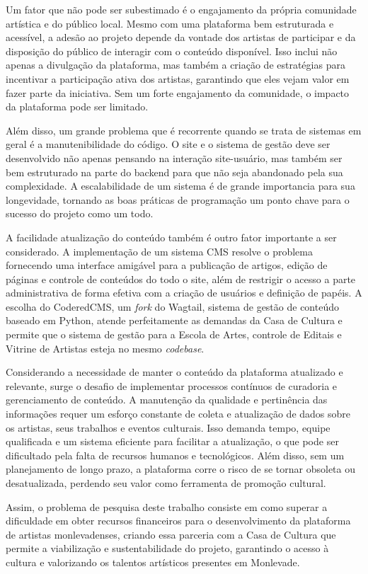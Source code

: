 Um fator que não pode ser subestimado é o engajamento da própria comunidade artística e do público local. Mesmo com uma plataforma bem estruturada e acessível, a adesão ao projeto depende da vontade dos artistas de participar e da disposição do público de interagir com o conteúdo disponível. Isso inclui não apenas a divulgação da plataforma, mas também a criação de estratégias para incentivar a participação ativa dos artistas, garantindo que eles vejam valor em fazer parte da iniciativa. Sem um forte engajamento da comunidade, o impacto da plataforma pode ser limitado.

Além disso, um grande problema que é recorrente quando se trata de sistemas em geral é a manutenibilidade do código. O site e o sistema de gestão deve ser desenvolvido não apenas pensando na interação site-usuário, mas também ser bem estruturado na parte do backend para que não seja abandonado pela sua complexidade. A escalabilidade de um sistema é de grande importancia para sua longevidade, tornando as boas práticas de programação um ponto chave para o sucesso do projeto como um todo.

A facilidade atualização do conteúdo também é outro fator importante a ser considerado. A implementação de um sistema CMS resolve o problema fornecendo uma interface amigável para a publicação de artigos, edição de páginas e controle de conteúdos do todo o site, além de restrigir o acesso a parte administrativa de forma efetiva com a criação de usuários e definição de papéis. A escolha do CoderedCMS, um \textit{fork} do Wagtail, sistema de gestão de conteúdo baseado em Python, atende perfeitamente as demandas da Casa de Cultura e permite que o sistema de gestão para a Escola de Artes, controle de Editais e Vitrine de Artistas esteja no mesmo \textit{codebase}.

Considerando a necessidade de manter o conteúdo da plataforma atualizado e relevante, surge o desafio de implementar processos contínuos de curadoria e gerenciamento de conteúdo. A manutenção da qualidade e pertinência das informações requer um esforço constante de coleta e atualização de dados sobre os artistas, seus trabalhos e eventos culturais. Isso demanda tempo, equipe qualificada e um sistema eficiente para facilitar a atualização, o que pode ser dificultado pela falta de recursos humanos e tecnológicos. Além disso, sem um planejamento de longo prazo, a plataforma corre o risco de se tornar obsoleta ou desatualizada, perdendo seu valor como ferramenta de promoção cultural.

Assim, o problema de pesquisa deste trabalho consiste em como superar a dificuldade em obter recursos financeiros para o desenvolvimento da plataforma de artistas monlevadenses, criando essa parceria com a Casa de Cultura que permite a viabilização e sustentabilidade do projeto, garantindo o acesso à cultura e valorizando os talentos artísticos presentes em Monlevade.

